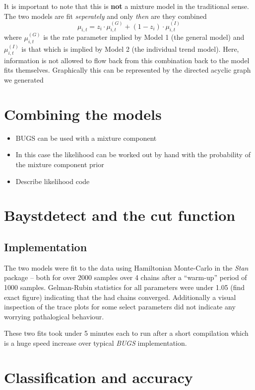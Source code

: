 \documentclass[11pt]{report}
\begin{document}
It is important to note that this is \textbf{not} a mixture model in the traditional sense. The two models are fit \emph{seperately} and only \emph{then} are they combined
\begin{equation}
\mu_{i,t} = z_i \cdot \mu_{i,t}^{(G)} + (1 - z_i) \cdot \mu_{i,t}^{(I)}
\end{equation}
where $\mu_{i,t}^{(G)}$ is the rate parameter implied by Model 1 (the general model) and $\mu_{i,t}^{(I)}$ is that which is implied by Model 2 (the individual trend model). Here, information is not allowed to flow back from this combination back to the model fits themselves. Graphically this can be represented by the directed acyclic graph we generated 


\section{Combining the models}

\begin{itemize}
\item BUGS can be used with a mixture component
\item In this case the likelihood can be worked out by hand with the probability of the mixture component prior
\item Describe likelihood code
\end{itemize}

\section{Baystdetect and the cut function}

\subsection{Implementation}

The two models were fit to the data using Hamiltonian Monte-Carlo in the \emph{Stan} package -- both for over 2000 samples over 4 chains after a ``warm-up'' period of 1000 samples. Gelman-Rubin statistics for all parameters were under 1.05 (find exact figure) indicating that the had chains converged. Additionally a visual inspection of the trace plots for some select parameters did not indicate any worrying pathalogical behaviour.

These two fits took under 5 minutes each to run after a short compilation which is a huge speed increase over typical \emph{BUGS} implementation.

\section{Classification and accuracy}
\end{document}
